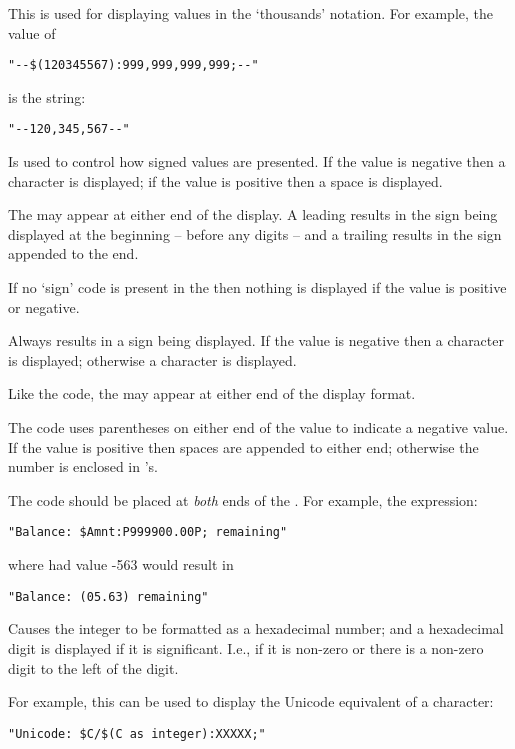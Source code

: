 \begin{description}
This is used for displaying values in the `thousands' notation. For example, the value of
\begin{lstlisting}
"--$(120345567):999,999,999,999;--"
\end{lstlisting}
is the string:
\begin{lstlisting}
"--120,345,567--"
\end{lstlisting}

\item[\q{-}] Is used to control how signed values are presented. If the value is negative then a \q{-} character is displayed; if the value is positive then a space is displayed.

\begin{aside}
The \q{-}  may appear at either end of the display. A leading \q{-} results in the sign being displayed at the beginning -- before any digits -- and a trailing \q{-} results in the sign appended to the end.
\end{aside}

\begin{aside}
\begin{aside}
If no `sign' code is present in the  then nothing is displayed if the value is positive or negative.
\end{aside}
\end{aside}

\item[\q{+}] Always results in a sign being displayed. If the value is negative then a \q{-} character is displayed; otherwise a \q{+} character is displayed.

Like the \q{-} code, the \q{+} may appear at either end of the display format.

\item[\q{P}] The  code uses parentheses on either end of the value to indicate a negative value. If the value is positive then spaces are appended to either end; otherwise the number is enclosed in \q{()}'s.

\begin{aside}
The  code should be placed at \emph{both} ends of the .
For example, the expression:
\begin{lstlisting}
"Balance: $Amnt:P999900.00P; remaining"
\end{lstlisting}
where  had value -563 would result in
\begin{lstlisting}
"Balance: (05.63) remaining"
\end{lstlisting}
\end{aside}
\item[\q{X}] Causes the integer to be formatted as a hexadecimal number; and a hexadecimal digit is displayed if it is significant. I.e., if it is non-zero or there is a non-zero digit to the left of the digit.

For example, this can be used to display the Unicode equivalent of a character:
\begin{lstlisting}
"Unicode: $C/$(C as integer):XXXXX;"
\end{lstlisting}

\end{description}

